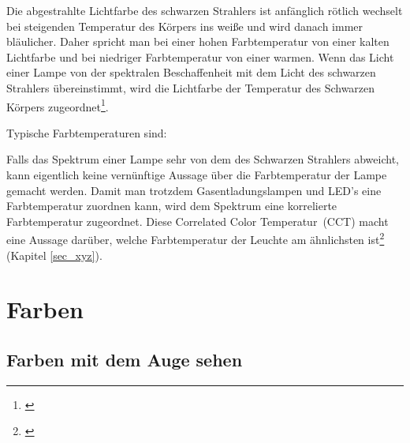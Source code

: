Die abgestrahlte Lichtfarbe des schwarzen Strahlers ist anfänglich rötlich wechselt bei steigenden Temperatur des Körpers ins weiße und wird danach immer bläulicher. Daher spricht man bei einer hohen Farbtemperatur von einer kalten Lichtfarbe und bei niedriger Farbtemperatur von einer warmen. Wenn das Licht einer Lampe von der spektralen Beschaffenheit mit dem Licht des schwarzen Strahlers übereinstimmt, wird die Lichtfarbe der Temperatur des Schwarzen Körpers zugeordnet\footnote{\cite[89]{mueller}}.

Typische Farbtemperaturen sind:


Falls das Spektrum einer Lampe sehr von dem des Schwarzen Strahlers abweicht, kann eigentlich keine vernünftige Aussage über die Farbtemperatur der Lampe gemacht werden. Damit man trotzdem Gasentladungslampen und LED's eine Farbtemperatur zuordnen kann, wird dem Spektrum eine korrelierte Farbtemperatur zugeordnet. Diese \glqq Correlated Color Temperatur\grqq\ (CCT) macht eine Aussage darüber, welche Farbtemperatur der Leuchte am ähnlichsten ist\footnote{\cite[91]{mueller}} (Kapitel \ref{sec_xyz}).

\chapter{Farben}


\section{Farben mit dem Auge sehen} \label{sec_auge}

